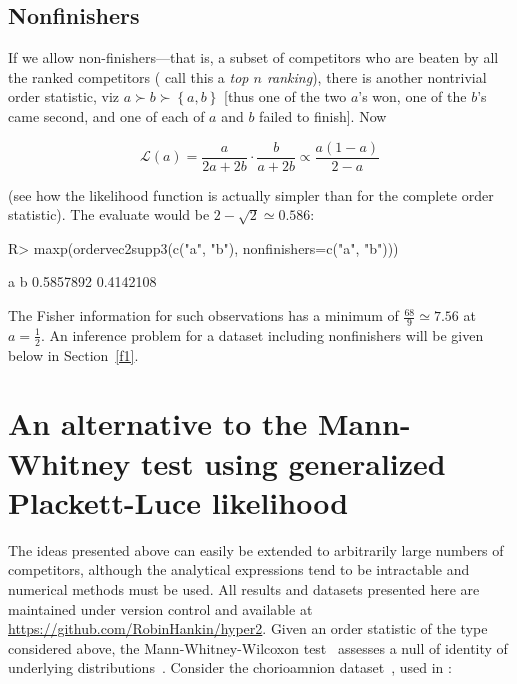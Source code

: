 \documentclass[article]{jss}
\begin{document}
\subsection{Nonfinishers}

If we allow non-finishers---that is, a subset of competitors who are
beaten by all the ranked competitors (\cite{turner2020} call this a
{\em top $n$ ranking}), there is another nontrivial order statistic,
viz $a\succ b\succ\left\lbrace a,b\right\rbrace$ [thus one of the two
  $a$'s won, one of the $b$'s came second, and one of each of $a$ and
  $b$ failed to finish].  Now

\begin{equation}
\mathcal{L}(a)=
\frac{a}{2a+2b}\cdot
\frac{b}{ a+2b}\propto\frac{a(1-a)}{2-a}
\end{equation}

(see how the likelihood function is actually simpler than for the
complete order statistic).  The evaluate would be $2-\sqrt{2}\simeq
0.586$:

\begin{Schunk}
\begin{Sinput}
R> maxp(ordervec2supp3(c("a", "b"), nonfinishers=c("a", "b")))
\end{Sinput}
\begin{Soutput}
        a         b 
0.5857892 0.4142108 
\end{Soutput}
\end{Schunk}

The Fisher information for such observations has a minimum of
$\frac{68}{9}\simeq 7.56$ at $a=\frac{1}{2}$.  An inference problem
for a dataset including nonfinishers will be given below in
Section~\ref{f1}.

\section{An alternative to the Mann-Whitney test using generalized
Plackett-Luce likelihood}

The ideas presented above can easily be extended to arbitrarily large
numbers of competitors, although the analytical expressions tend to be
intractable and numerical methods must be used.  All results and
datasets presented here are maintained under version control and
available at \url{https://github.com/RobinHankin/hyper2}.  Given an
order statistic of the type considered above, the
Mann-Whitney-Wilcoxon test~\citep{mann1947,wilcoxon1945} assesses a
null of identity of underlying distributions~\citep{ahmad1996}.
Consider the chorioamnion dataset~\citep{hollander2013}, used in
:
\end{document}
